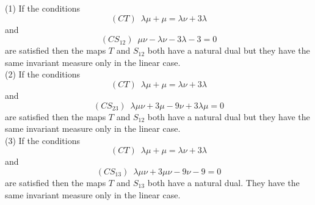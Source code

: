 \documentclass[10pt,a4paper]{amsart}
\begin{document}
	\begin{theorem}
	(1) If the conditions 
	$$(CT) \, \, \, \lambda \mu + \mu = \lambda \nu + 3 \lambda$$ and
	$$(CS_{12}) \, \, \, \mu \nu - \lambda \nu - 3\lambda -3 =0$$ are satisfied then the maps $T$ and $S_{12}$ both have a natural dual but they have the same invariant measure only in the linear case. \\
	(2) If the conditions 
	$$(CT) \, \, \, \lambda \mu + \mu = \lambda \nu + 3 \lambda$$ and
	$$(CS_{23}) \, \, \, \lambda \mu \nu + 3\mu - 9 \nu +3 \lambda \mu  =0$$ are satisfied then the maps $T$ and $S_{12}$ both have a natural dual but they have the same invariant measure only in the linear case. \\
	(3) If the conditions 
	$$(CT) \, \, \, \lambda \mu  + \mu = \lambda \nu  + 3 \lambda$$ and
	$$(CS_{13}) \, \, \, \lambda \mu \nu + 3\mu \nu - 9 \nu -9 =0$$ are satisfied then the maps $T$ and $S_{13}$ both have a natural dual. They have the same invariant measure only in the linear case. 
	\end{theorem}
\end{document}
